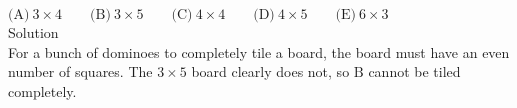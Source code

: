 $\text{(A)}\ 3\times 4 \qquad \text{(B)}\ 3\times 5 \qquad \text{(C)}\ 4\times 4 \qquad \text{(D)}\ 4\times 5 \qquad \text{(E)}\ 6\times 3$
\\
Solution
\\
For a bunch of dominoes to completely tile a board, the board must have an even number of squares. The $3\times 5$ board clearly does not, so $\boxed{\text{B}}$ cannot be tiled completely.
